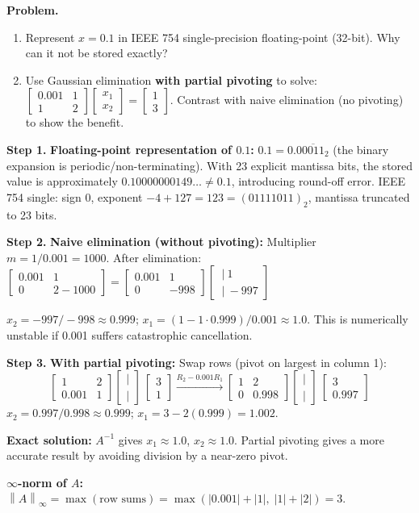 \documentclass[12pt,a4paper]{article}
\newcommand{\step}[1]{\noindent\textbf{Step #1.}\;}
\newcommand{\mat}[1]{\begin{bmatrix}#1\end{bmatrix}}
\newcommand{\norm}[1]{\left\lVert #1 \right\rVert}
\begin{document}
	\begin{tcolorbox}[worked]
		\textbf{Problem.}
		\begin{enumerate}[label=(\alph*), nosep]
			\item Represent $x = 0.1$ in IEEE 754 single-precision floating-point (32-bit).
			Why can it not be stored exactly?
			\item Use Gaussian elimination \textbf{with partial pivoting} to solve:
			$\mat{0.001 & 1 \\ 1 & 2}\mat{x_1\\x_2}=\mat{1\\3}$.
			Contrast with naive elimination (no pivoting) to show the benefit.
		\end{enumerate}
		
		\step{1} \textbf{Floating-point representation of $0.1$:}
		$0.1 = 0.0\overline{0011}_2$ (the binary expansion is periodic/non-terminating).
		With 23 explicit mantissa bits, the stored value is approximately
		$0.10000000149\ldots \neq 0.1$, introducing round-off error.
		IEEE 754 single: sign $0$, exponent $-4+127=123=(01111011)_2$, mantissa truncated to 23 bits.
		
		\step{2} \textbf{Naive elimination (without pivoting):}
		Multiplier $m = 1/0.001 = 1000$. After elimination:
		$\mat{0.001 & 1 \\ 0 & 2-1000}=\mat{0.001 & 1 \\ 0 & -998}\mat{\ |\ \!1\\\ |\ -997}$
		
		$x_2 = -997/-998 \approx 0.999$;\; $x_1 = (1-1\cdot0.999)/0.001 \approx 1.0$.
		This is numerically unstable if 0.001 suffers catastrophic cancellation.
		
		\step{3} \textbf{With partial pivoting:} Swap rows (pivot on largest in column 1):
		\[
		\mat{1&2\\0.001&1}\mat{|\\|}\ \mat{3\\1}
		\xrightarrow{R_2-0.001R_1}
		\mat{1&2\\0&0.998}\mat{|\\|}\ \mat{3\\0.997}
		\]
		$x_2 = 0.997/0.998 \approx 0.999$;\; $x_1 = 3-2(0.999) = 1.002$.
		
		\textbf{Exact solution:} $A^{-1}$ gives $x_1\approx1.0$, $x_2\approx1.0$. Partial pivoting gives a more accurate result by avoiding division by a near-zero pivot.
		
		\textbf{$\infty$-norm of $A$:} $\norm{A}_\infty = \max(\text{row sums}) = \max(|0.001|+|1|,\;|1|+|2|) = 3$.
	\end{tcolorbox}
	
\end{document}
